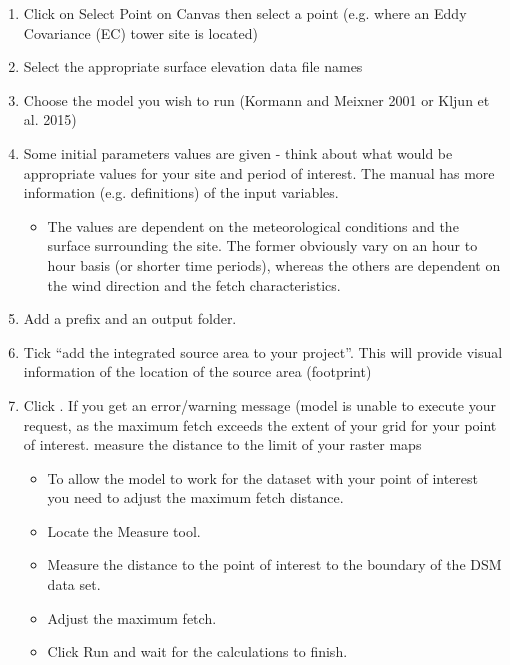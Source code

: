 \documentclass[letterpaper,10pt,english]{sphinxmanual}
\begin{document}
\begin{enumerate}
\item {} 
Click on Select Point on Canvas \textendash{} then select a point (e.g. where an Eddy Covariance (EC) tower site is located)

\item {} 
Select the appropriate surface elevation data file names

\item {} 
Choose the model you wish to run (Kormann and Meixner 2001 or Kljun et al. 2015)

\item {} 
Some initial parameters values are given - think about what would be appropriate values for your site and period   of interest. The manual has   more information (e.g. definitions) of the input variables.
\begin{itemize}
\item {} 
The values are dependent on the meteorological conditions and the surface surrounding the site. The former   obviously vary on an hour to hour basis (or shorter time periods), whereas the others are dependent on the wind direction and the fetch characteristics.

\end{itemize}

\item {} 
Add a prefix and an output folder.

\item {} 
Tick “add the integrated source area to your project”. This will provide visual information of the location of the source area (footprint)

\item {} 
Click . If you get an error/warning message (model is unable to execute your request, as the maximum fetch exceeds the extent of your grid for your point of interest. measure the distance to the limit of your raster maps
\begin{itemize}
\item {} 
To allow the model to work for the dataset with your point of interest you need to adjust the maximum fetch distance.

\item {} 
Locate the Measure tool.

\item {} 
Measure the distance to the point of interest to the boundary of the DSM data set.

\item {} 
Adjust the maximum fetch.

\item {} 
Click Run and wait for the calculations to finish.

\end{itemize}

\end{enumerate}
\end{document}
